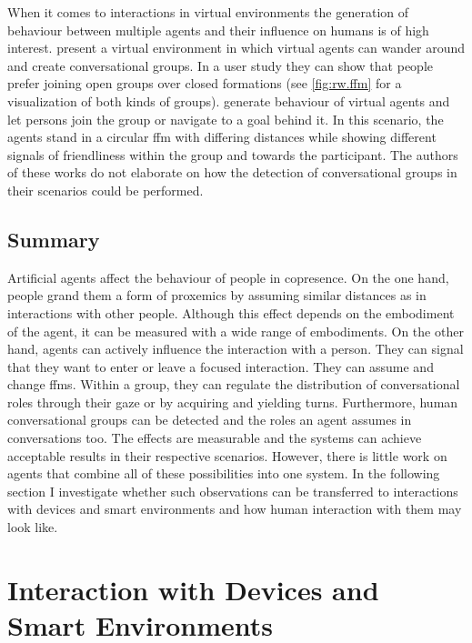 When it comes to interactions in virtual environments the generation of  behaviour between multiple agents and their influence on humans is of high interest.
 present a virtual environment in which \glspl{virtual agent} can wander around and create \glspl{conversational group}.
In a user study they can show that people prefer joining open groups over closed formations (see \cref{fig:rw.ffm} for a visualization of both kinds of groups).
 generate  behaviour of \glspl{virtual agent} and let persons join the group or navigate to a goal behind it.
In this scenario, the agents stand in a circular \gls{ffm} with differing distances while showing different signals of friendliness within the group and towards the participant.
The authors of these works do not elaborate on how the detection of \glspl{conversational group} in their scenarios could be performed.

\subsection{Summary}

Artificial agents affect the behaviour of people in \gls{copresence}.
On the one hand, people grand them a form of \gls{proxemics} by assuming similar distances as in interactions with other people.
Although this effect depends on the embodiment of the agent, it can be measured with a wide range of embodiments.
On the other hand, agents can actively influence the interaction with a person.
They can signal that they want to enter or leave a \gls{focused interaction}.
They can assume and change \glspl{ffm}.
Within a group, they can regulate the distribution of \glspl{conversational role} through their gaze or by acquiring and yielding  \glspl{turn}.
Furthermore, human \glspl{conversational group} can be detected and the roles an agent assumes in \glspl{conversation} too.
The effects are measurable and the systems can achieve acceptable results in their respective scenarios.
However, there is little work on agents that combine all of these possibilities into one system. 
In the following section I investigate whether such observations can be transferred to interactions with \glspl{device} and \glspl{smart environment} and how human interaction with them may look like.

\section{Interaction with Devices and Smart Environments}\label{sec.rw.hi.dev-rw}

